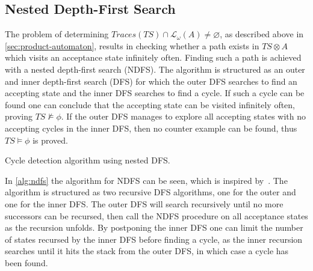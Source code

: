 \subsection{Nested Depth-First Search}\label{sec:methods-ndfs}
The problem of determining $Traces(TS) \cap \mathcal{L_\omega}(A) \neq \varnothing$, as described above in \autoref{sec:product-automaton}, results in checking whether a path exists in $TS \otimes A$ which visits an acceptance state infinitely often. Finding such a path is achieved with a nested depth-first search (NDFS). The algorithm is structured as an outer and inner depth-first search (DFS) for which the outer DFS searches to find an accepting state and the inner DFS searches to find a cycle. If such a cycle can be found one can conclude that the accepting state can be visited infinitely often, proving $TS \not\models \phi$. If the outer DFS manages to explore all accepting states with no accepting cycles in the inner DFS, then no counter example can be found, thus $TS \models \phi$ is proved.
\begin{algorithm}[H]
\SetAlgoLined
\DontPrintSemicolon
{}
\;

\caption{Cycle detection algorithm using nested DFS.}
\label{alg:ndfs}
\end{algorithm}
In \autoref{alg:ndfs} the algorithm for NDFS can be seen, which is inspired by~\cite[Fig.~4]{holzmann1996nested}. The algorithm is structured as two recursive DFS algorithms, one for the outer and one for the inner DFS. The outer DFS will search recursively until no more successors can be recursed, then call the NDFS procedure on all acceptance states as the recursion unfolds. By postponing the inner DFS one can limit the number of states recursed by the inner DFS before finding a cycle, as the inner recursion searches until it hits the stack from the outer DFS, in which case a cycle has been found.